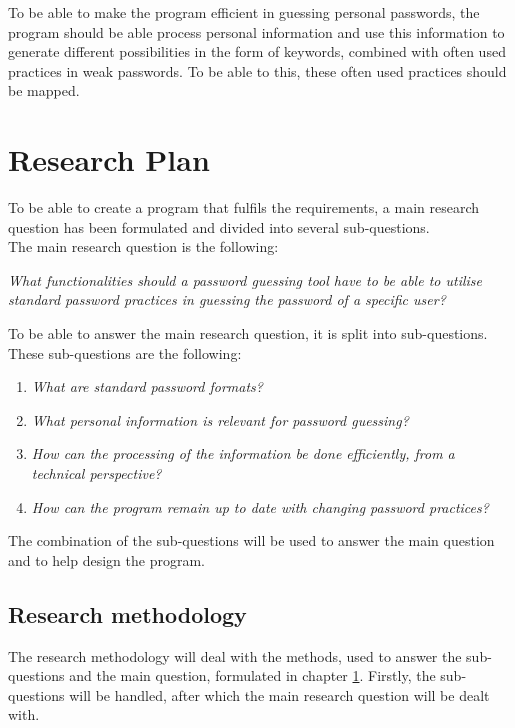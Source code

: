 \documentclass[a4paper,12pt]{article}
\begin{document}
To be able to make the program efficient in guessing personal passwords, the program should be able process personal information and use this information to generate different possibilities in the form of keywords, combined with often used practices in weak passwords. To be able to this, these often used practices should be mapped.

\newpage
\section{Research Plan}
\label{ch:rp}
To be able to create a program that fulfils the requirements, a main research question has been formulated and divided into several sub-questions.\\

The main research question is the following:

\vspace{0.3cm}
\textit{What functionalities should a password guessing tool have to be able to utilise standard password practices in guessing the password of a specific user?}
\vspace{0.3cm}

To be able to answer the main research question, it is split into sub-questions. These sub-questions are the following:

\vspace{0.3cm}
\begin{enumerate}
\item \textit{What are standard password formats?}
\item \textit{What personal information is relevant for password guessing?}
\item \textit{How can the processing of the information be done efficiently, from a technical perspective?}
\item \textit{How can the program remain up to date with changing password practices?}
\end{enumerate}
\vspace{0.3cm}

The combination of the sub-questions will be used to answer the main question and to help design the program.

\subsection{Research methodology}
The research methodology will deal with the methods, used to answer the sub-questions and the main question, formulated in chapter \ref{ch:rp}. Firstly, the sub-questions will be handled, after which the main research question will be dealt with.
\end{document}
